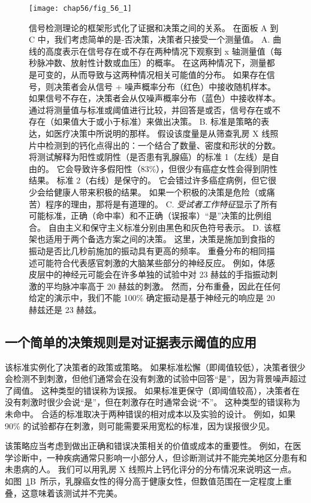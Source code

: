 \begin{figure}[htbp]
	\centering
	\texttt{[image: chap56/fig\_56\_1]}
	\caption{信号检测理论的框架形式化了证据和决策之间的关系。
		在面板 A 到 C 中，我们考虑简单的是-否决策，决策者只接受一个测量值。
		A. 曲线的高度表示在信号存在或不存在两种情况下观察到 x 轴测量值（每秒脉冲数、放射性计数或血压）的概率。
		在这两种情况下，测量都是可变的，从而导致与这两种情况相关可能值的分布。
		如果存在信号，则决策者会从信号 + 噪声概率分布（红色）中接收随机样本。
		如果信号不存在，决策者会从仅噪声概率分布（蓝色）中接收样本。
		通过将测量值与标准或阈值进行比较，并回答是或否，信号存在或不存在（如果值大于或小于标准）来做出决策。
		B. 标准是策略的表达，如医疗决策中所说明的那样。
		假设该度量是从筛查乳房 X 线照片中检测到的钙化点得出的：一个结合了数量、密度和形状的分数。
		将测试解释为阳性或阴性（是否患有乳腺癌）的标准 1（左线）是自由的。
		它会导致许多假阳性（83\%），但很少有癌症女性会得到阴性结果。
		标准 2（右线）是保守的。
		它会错过许多癌症病例，但它很少会给健康人带来积极的结果。
		如果一个积极的决策是危险（或痛苦）程序的理由，那将是有道理的。
		C. \textit{受试者工作特征}显示了所有可能标准，正确（命中率）和不正确（误报率）“是”决策的比例组合。
		自由主义和保守主义标准分别由黑色和灰色符号表示。
		D. 该框架也适用于两个备选方案之间的决策。
		这里，决策是施加到食指的振动是否比几秒前施加的振动具有更高的频率。
		重叠分布的相同描述可能符合代表感官刺激的大脑某些部分的神经反应。
		例如，体感皮层中的神经元可能会在许多单独的试验中对 23 赫兹的手指振动刺激的平均脉冲率高于 20 赫兹的刺激。
		然而，分布重叠，因此在任何给定的演示中，我们不能 100\% 确定振动是基于神经元的响应是 20 赫兹还是 23 赫兹。}
	\label{fig:56_1}
\end{figure}


\subsection{一个简单的决策规则是对证据表示阈值的应用}

该标准实例化了决策者的政策或策略。
如果标准松懈（即阈值较低），决策者很少会检测不到刺激，但他们通常会在没有刺激的试验中回答“是”，因为背景噪声超过了阈值。
这种类型的错误称为误报。
如果标准更保守（即阈值较高），决策者在没有刺激时很少会说“是”，但在刺激存在时通常会说“不”。
这种类型的错误称为未命中。
合适的标准取决于两种错误的相对成本以及实验的设计。
例如，如果 90\% 的试验都存在刺激，则可能需要采用宽松的标准，因为误报很少见。


该策略应当考虑到做出正确和错误决策相关的价值或成本的重要性。
例如，在医学诊断中，一种疾病通常只影响一小部分人，但诊断测试并不能完美地区分患有和未患病的人。
我们可以用乳房 X 线照片上钙化评分的分布情况来说明这一点。
如图~\ref{fig:56_1}B~所示，乳腺癌女性的得分高于健康女性，但数值范围在一定程度上重叠，这意味着该测试并不完美。



